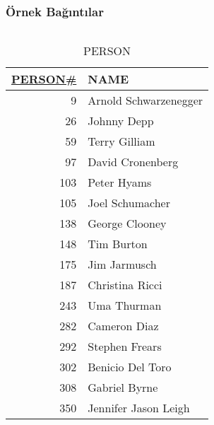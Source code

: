 \documentclass[dvipsnames]{beamer}
\theoremstyle{plain}
\begin{document}
\begin{frame}
  \frametitle{Örnek Bağıntılar}

  \begin{columns}[b]
    \begin{tiny}
    \begin{table}
      \caption{PERSON}
      \begin{tabular}{|r|l|}\hline
\underline{PERSON\#} & NAME\\[2pt]\hline\hline
   9 & Arnold Schwarzenegger\\\hline
  26 & Johnny Depp          \\\hline
  59 & Terry Gilliam        \\\hline
  97 & David Cronenberg     \\\hline
 103 & Peter Hyams          \\\hline
 105 & Joel Schumacher      \\\hline
 138 & George Clooney       \\\hline
 148 & Tim Burton           \\\hline
 175 & Jim Jarmusch         \\\hline
 187 & Christina Ricci      \\\hline
 243 & Uma Thurman          \\\hline
 282 & Cameron Diaz         \\\hline
 292 & Stephen Frears       \\\hline
 302 & Benicio Del Toro     \\\hline
 308 & Gabriel Byrne        \\\hline
 350 & Jennifer Jason Leigh \\\hline
      \end{tabular}
    \end{table}
    \end{tiny}


\end{columns}
\end{frame}
\end{document}
